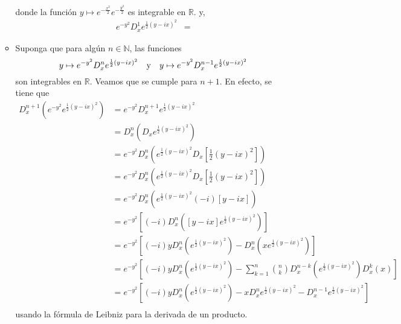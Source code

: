 \documentclass[12pt]{report}
\theoremstyle{largebreak}
\begin{document}
\begin{sol}
\begin{itemize}
\begin{itemize}
                donde la función $y\mapsto e^{-\frac{x^2}{2}}e^{-\frac{y^2}{2}}$ es integrable en $\mathbb{R}$.
                y,
                \begin{equation*}
                    \begin{split}
                        e^{ -y^2}D_x^1e^{\frac{1}{2}\left(y-ix \right)^2}&=
                    \end{split}
                \end{equation*}
                \item Suponga que para algún $n\in\mathbb{N}$, las funciones
                \begin{equation*}
                    y\mapsto e^{ -y^2}D_x^ne^{\frac{1}{2}\left(y-ix \right)^2}\quad\textup{y}\quad y\mapsto e^{ -y^2}D_x^{n-1}e^{\frac{1}{2}\left(y-ix \right)^2}
                \end{equation*}
                son integrables en $\mathbb{R}$. Veamos que se cumple para $n+1$. En efecto, se tiene que
                \begin{equation*}
                    \begin{split}
                        D_x^{n+1}\left(e^{-y^2}e^{\frac{1}{2}\left(y-ix \right)^2}\right)&=e^{-y^2}D_x^{n+1}e^{\frac{1}{2}\left(y-ix \right)^2}\\
                        &=D_x^n\left(D_x e^{\frac{1}{2}\left(y-ix \right)^2}\right)\\
                        &=e^{-y^2}D_x^n\left(e^{\frac{1}{2}\left(y-ix \right)^2}D_x\left[\frac{1}{2}\left(y-ix \right)^2\right] \right)\\
                        &=e^{-y^2}D_x^n\left(e^{\frac{1}{2}\left(y-ix \right)^2}D_x\left[\frac{1}{2}\left(y-ix \right)^2\right] \right)\\
                        &=e^{-y^2}D_x^n\left(e^{\frac{1}{2}\left(y-ix \right)^2}(-i)[y-ix]\right)\\
                        &=e^{-y^2}\left[(-i)D_x^n\left([y-ix]e^{\frac{1}{2}\left(y-ix \right)^2}\right)\right] \\
                        &=e^{-y^2}\left[(-i)yD_x^n\left(e^{\frac{1}{2}\left(y-ix \right)^2}\right)-D_x^n\left(xe^{\frac{1}{2}\left(y-ix \right)^2}\right)\right] \\
                        &=e^{-y^2}\left[(-i)yD_x^n\left(e^{\frac{1}{2}\left(y-ix \right)^2}\right)-\sum_{ k=1}^n {n\choose k} D_x^{ n-k}\left(e^{\frac{1}{2}\left(y-ix \right)^2}\right)D_x^k(x)\right] \\
                        &=e^{-y^2}\left[(-i)yD_x^n\left(e^{\frac{1}{2}\left(y-ix \right)^2}\right)-xD_x^ne^{\frac{1}{2}\left(y-ix \right)^2}-D_x^{n-1}e^{\frac{1}{2}\left(y-ix \right)^2}\right]\\
                    \end{split}
                \end{equation*}
                usando la fórmula de Leibniz para la derivada de un producto.
            \end{itemize}
        \end{itemize}
    \end{sol}
\end{document}
